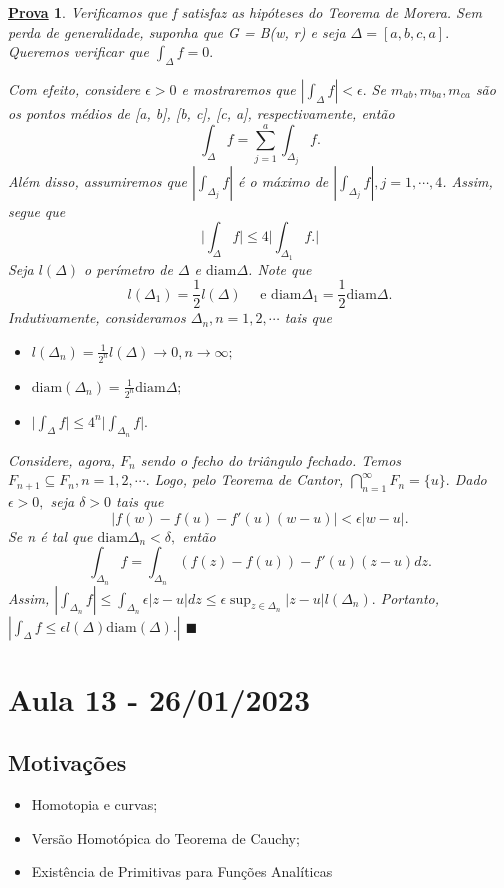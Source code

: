 \documentclass{article}
\newtheorem*{proof*}{\underline{Prova}}
\renewcommand\qedsymbol{$\blacksquare$}
\begin{document}
  \begin{proof*}
    Verificamos que f satisfaz as hip\'oteses do Teorema de Morera. 
    Sem perda de generalidade, suponha que G = B(w, r) e seja $\Delta=[a, b, c, a].$
    Queremos verificar que $\int_{\Delta}^{}f = 0.$

    Com efeito, considere $\epsilon > 0$ e mostraremos que $|\int_{\Delta}^{}f| < \epsilon.$ Se 
    $m_{ab}, m_{ba}, m_{ca}$ s\~ao os pontos m\'edios de [a, b], [b, c], [c, a], respectivamente, 
    ent\~ao
    $$
    \int_{\Delta}^{}f = \sum\limits_{j=1}^{a}\int_{\Delta_{j}}^{}f.
    $$
    Al\'em disso, assumiremos que $|\int_{\Delta_j}^{}f|$ \'e o m\'aximo de 
    $|\int_{\Delta_{j}}^{}f|, j = 1, \cdots, 4$. Assim, segue que 
    $$
    \biggl|\int_{\Delta}^{}f\biggr|\leq4 \biggl|\int_{\Delta_{1}}^{}f.\biggr|
    $$
    Seja $l(\Delta)$ o per\'imetro de $\Delta$ e $\mathrm{diam} \Delta$. Note que 
    $$
    l(\Delta_{1}) = \frac{1}{2}l(\Delta)\quad\text{ e } \mathrm{diam} \Delta_{1} = \frac{1}{2}\mathrm{diam }\Delta.
    $$
    Indutivamente, consideramos $\Delta_{n}, n = 1, 2, \cdots$ tais que
    \begin{itemize}
      \item[1)] $l(\Delta_{n}) = \frac{1}{2^n}l(\Delta)\to0, n\to\infty;$
      \item[2)] $\mathrm{diam}(\Delta_{n}) = \frac{1}{2^n}\mathrm{diam} \Delta;$
      \item[3)] $\biggl|\int_{\Delta}^{}f\biggr|\leq 4^n\biggl|\int_{\Delta_{n}}^{}f\biggr|.$
    \end{itemize}
    Considere, agora, $F_{n}$ sendo o fecho do tri\^angulo fechado. Temos 
    $F_{n+1}\subseteq{F_{n}}, n=1, 2, \cdots.$ Logo, pelo Teorema de Cantor, $\bigcap_{n=1}^{\infty}F_{n}=\{u\}. $
    Dado $\epsilon > 0,$ seja $\delta > 0$ tais que 
    $$
    |f(w) - f(u) - f'(u)(w-u)| < \epsilon|w-u|.
    $$
    Se n \'e tal que $\mathrm{diam} \Delta_{n} < \delta,$ ent\~ao
    $$
    \int_{\Delta_{n}}^{}f = \int_{\Delta_{n}}^{}(f(z) - f(u)) - f'(u)(z-u)dz.
    $$
    Assim, $|\int_{\Delta_{n}}^{}f|\leq \int_{\Delta_{n}}^{}\epsilon|z-u|dz\leq \epsilon\sup_{z\in{\Delta_{n}}}|z-u|l(\Delta_{n}).$
    Portanto, $|\int_{\Delta}^{}f \leq \epsilon l(\Delta) \mathrm{diam}(\Delta).|$ \qedsymbol
  \end{proof*}
  \newpage

  \section{Aula 13 - 26/01/2023}
  \subsection{Motiva\c c\~oes}
  \begin{itemize}
    \item Homotopia e curvas;
    \item Vers\~ao Homot\'opica do Teorema de Cauchy;
    \item Exist\^encia de Primitivas para Fun\c c\~oes Anal\'iticas 
  \end{itemize}
\end{document}
